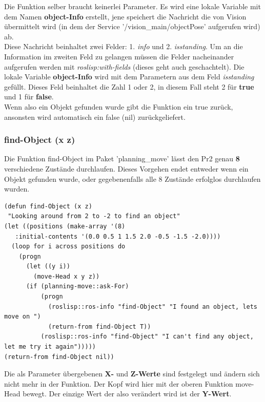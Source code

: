 \documentclass{suturo}
\begin{document}
Die Funktion selber braucht keinerlei Parameter. Es wird eine lokale Variable mit dem Namen \textbf{object-Info} erstellt, jene speichert die Nachricht die von Vision übermittelt wird (in dem der Service '/vision\_main/objectPose' aufgerufen wird) ab.\\

 Diese Nachricht beinhaltet zwei Felder: 1. \textit{info} und 2. \textit{isstanding}. Um an die Information im zweiten Feld zu gelangen müssen die Felder nacheinander aufgerufen werden mit \textit{roslisp:with-fields} (dieses geht auch geschachtelt). Die lokale Variable \textbf{object-Info} wird mit dem Parametern aus dem Feld \textit{isstanding} gefüllt. Dieses Feld beinhaltet die Zahl 1 oder 2, in diesem Fall steht 2 für \textbf{true} und 1 für \textbf{false}.\\
 
  Wenn also ein Objekt gefunden wurde gibt die Funktion ein true zurück, ansonsten wird automatisch ein false (nil) zurückgeliefert. 




\subsubsection{find-Object (x z)}
Die Funktion find-Object im Paket 'planning\_move' lässt den Pr2 genau \textbf{8} verschiedene Zustände durchlaufen. Dieses Vorgehen endet entweder wenn ein Objekt gefunden wurde, oder gegebenenfalls alle 8 Zustände erfolglos durchlaufen wurden.

\noindent
\begin{minipage}{\linewidth}
\begin{lstlisting}
(defun find-Object (x z)
 "Looking around from 2 to -2 to find an object"
(let ((positions (make-array '(8) 
   :initial-contents '(0.0 0.5 1 1.5 2.0 -0.5 -1.5 -2.0))))
  (loop for i across positions do
    (progn
      (let ((y i))
        (move-Head x y z))
      (if (planning-move::ask-For)
          (progn
            (roslisp::ros-info "find-Object" "I found an object, lets move on ")
            (return-from find-Object T))
          (roslisp::ros-info "find-Object" "I can't find any object, let me try it again")))))
(return-from find-Object nil))
\end{lstlisting}
\end{minipage}

 Die als Parameter übergebenen \textbf{X-} und \textbf{Z-Werte} sind festgelegt und ändern sich nicht mehr in der Funktion. Der Kopf wird hier mit der oberen Funktion move-Head bewegt. Der einzige Wert der also verändert wird ist der \textbf{Y-Wert}.\\
\end{document}
